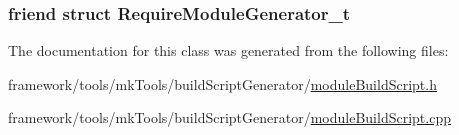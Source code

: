 \subsubsection[{\texorpdfstring{Require\+Module\+Generator\+\_\+t}{RequireModuleGenerator_t}}]{\setlength{\rightskip}{0pt plus 5cm}friend struct {\bf Require\+Module\+Generator\+\_\+t}\hspace{0.3cm}{\ttfamily [friend]}}\hypertarget{classninja_1_1_module_build_script_generator__t_a8a34114fe25e49ed24f26c95d44c8a86}{}\label{classninja_1_1_module_build_script_generator__t_a8a34114fe25e49ed24f26c95d44c8a86}


The documentation for this class was generated from the following files\+:\begin{DoxyCompactItemize}
\item 
framework/tools/mk\+Tools/build\+Script\+Generator/\hyperlink{module_build_script_8h}{module\+Build\+Script.\+h}\item 
framework/tools/mk\+Tools/build\+Script\+Generator/\hyperlink{module_build_script_8cpp}{module\+Build\+Script.\+cpp}\end{DoxyCompactItemize}
